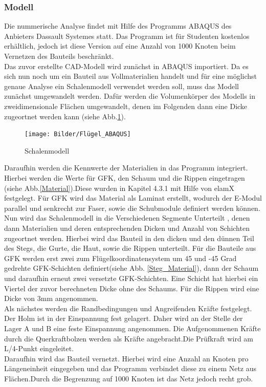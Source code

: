 
\subsubsection{Modell}
Die nummerische Analyse findet mit Hilfe des Programms ABAQUS des Anbieters Dassault Systemes statt. Das Programm ist für Studenten kostenlos erhältlich, jedoch ist diese Version auf eine Anzahl von 1000 Knoten beim Vernetzen des Bauteils beschränkt.\\
Das zuvor erstellte CAD-Modell wird zunächst in ABAQUS importiert. Da es sich nun noch um ein Bauteil aus Vollmaterialien handelt und für eine möglichst genaue Analyse ein Schalenmodell verwendet werden soll, muss das Modell zunächst umgewandelt werden. Dafür werden die Volumenkörper des Modells in zweidimensionale Flächen umgewandelt, denen im Folgenden dann eine Dicke zugeortnet werden kann (siehe Abb.\ref{Schalenmodell}).

\begin{figure}[h]
 \centering
 \texttt{[image: Bilder/Flügel\_ABAQUS]}
 \caption{Schalenmodell}
 \label{Schalenmodell}
\end{figure}
\newpage
\noindent
Daraufhin werden die Kennwerte der Materialien in das Programm integriert. Hierbei werden die Werte für GFK, den Schaum und die Rippen eingetragen (siehe Abb.\ref{Material}).Diese wurden in Kapitel 4.3.1 mit Hilfe von elamX festgelegt. Für GFK wird das Material als Laminat erstellt, wodurch der E-Modul parallel und senkrecht zur Faser, sowie die Schubmodule definiert werden können.\\
\noindent
Nun wird das Schalenmodell in die Verschiedenen Segmente Unterteilt , denen dann Materialien und deren entsprechenden Dicken und Anzahl von Schichten zugeortnet werden. Hierbei wird das Bauteil in den dicken und den dünnen Teil des Stegs, die Gurte, die Haut, sowie die Rippen unterteilt. Für die Bauteile aus GFK werden erst zwei zum Flügelkoordinatensystem um 45 und -45 Grad gedrehte GFK-Schichten definiert(siehe Abb. \ref{Steg_Material}), dann der Schaum und daraufhin erneut zwei versetzte GFK-Schichten. Eine Schicht hat hierbei ein Viertel der zuvor berechneten Dicke ohne des Schaums. Für die Rippen wird eine Dicke von 3mm angenommen.\\
\noindent
Als nächstes werden die Randbedingungen und Angreifenden Kräfte festgelegt. Der Holm ist in der Einspannung fest gelagert. Daher wird an der Stelle der Lager A und B eine feste Einspannung angenommen. Die Aufgenommenen Kräfte durch die Querkraftbolzen werden als Kräfte angebracht.Die Prüfkraft wird am L/4-Punkt eingeleitet.\\
Daraufhin wird das Bauteil vernetzt. Hierbei wird eine Anzahl an Knoten pro Längeneinheit eingegeben und das Programm verbindet diese zu einem Netz aus Flächen.Durch die Begrenzung auf 1000 Knoten ist das Netz jedoch recht grob. \\
\newpage
